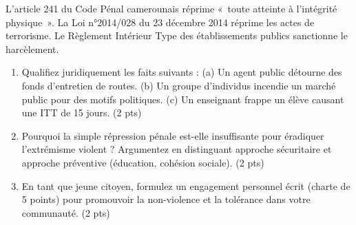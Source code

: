 \documentclass[11pt]{article}
\begin{document}
\begin{exercice}
L'article 241 du Code Pénal camerounais réprime «~toute atteinte à l'intégrité physique~». La Loi n°2014/028 du 23 décembre 2014 réprime les actes de terrorisme. Le Règlement Intérieur Type des établissements publics sanctionne le harcèlement.
\begin{enumerate}
    \item Qualifiez juridiquement les faits suivants : (a) Un agent public détourne des fonds d'entretien de routes. (b) Un groupe d'individus incendie un marché public pour des motifs politiques. (c) Un enseignant frappe un élève causant une ITT de 15 jours. (2 pts)
    \item Pourquoi la simple répression pénale est-elle insuffisante pour éradiquer l'extrémisme violent ? Argumentez en distinguant approche sécuritaire et approche préventive (éducation, cohésion sociale). (2 pts)
    \item En tant que jeune citoyen, formulez un engagement personnel écrit (charte de 5 points) pour promouvoir la non-violence et la tolérance dans votre communauté. (2 pts)
\end{enumerate}
\end{exercice}
\end{document}
